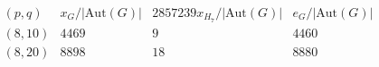 \[\begin{array}{c|rrr}
(p,q)&x_G/|\mathrm{Aut}(G)|&2857239x_{H_7}/|\mathrm{Aut}(G)|&e_G/|\mathrm{Aut}(G)|\\\hline
(8,10)&4469&9&4460\\
(8,20)&8898&18&8880\\
\end{array}\]
